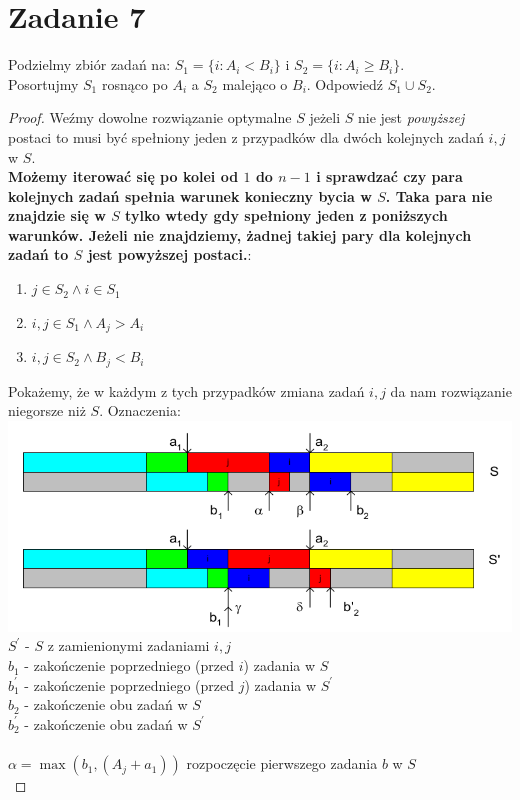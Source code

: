 \documentclass{article}
\begin{document}
\section{Zadanie 7}
Podzielmy zbiór zadań na: $S_1 = \{i: A_i < B_i\}$ i $S_2 = \{i: A_i \geq B_i\}$.\\ Posortujmy $S_1$ rosnąco po $A_i$ a $S_2$ malejąco o $B_i$. Odpowiedź $S_1 \cup S_2$.
\begin{proof}
Weźmy dowolne rozwiązanie optymalne $S$ jeżeli $S$ nie jest \textit{powyższej} postaci to musi być spełniony jeden z przypadków dla dwóch kolejnych zadań $i,j$ w $S$.\\\textbf{Możemy iterować się po kolei od $1$ do $n-1$ i sprawdzać czy para kolejnych zadań spełnia warunek konieczny bycia w $S$. Taka para nie znajdzie się w $S$ tylko wtedy gdy spełniony jeden z poniższych warunków. Jeżeli nie znajdziemy, żadnej takiej pary dla kolejnych zadań to $S$ jest powyższej postaci.}:
\begin{enumerate}
    \item $j \in S_2 \land i \in S_1$
    \item $i,j \in S_1 \land A_j > A_i$
    \item $i,j \in S_2 \land B_j < B_i$
\end{enumerate}
Pokażemy, że w każdym z tych przypadków zmiana zadań $i,j$ da nam rozwiązanie niegorsze niż $S$. Oznaczenia:\\
\includegraphics[scale=0.5]{zad7}
$S^\prime$ - $S$ z zamienionymi zadaniami $i,j$\\
$b_{1}$ - zakończenie poprzedniego (przed $i$) zadania w $S$\\
$b_{1}^\prime$ - zakończenie poprzedniego (przed $j$) zadania w $S^\prime$\\
$b_{2}$ - zakończenie obu zadań w $S$\\
$b_{2}^\prime$ - zakończenie obu zadań w $S^\prime$\\\\
$\alpha = \max(b_1, (A_j + a_1))$ rozpoczęcie pierwszego zadania $b$ w $S$\\

\end{proof}
\end{document}
